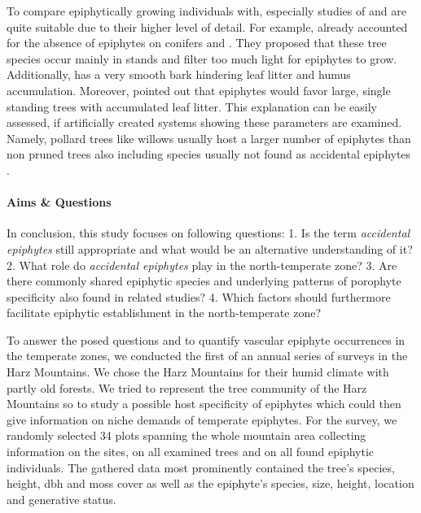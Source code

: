 \documentclass[12pt, a4paper, oneside, draft]{scrartcl}
\begin{document}
	To compare epiphytically growing individuals with, especially studies of \textcite{Staeger1908} and \textcite{Loew1892} are quite suitable due to their higher level of detail. For example, \textcite[p. 34]{Staeger1908} already accounted for the absence of epiphytes on conifers and \fsylvatica. They proposed that these tree species occur mainly in  stands and filter too much light for epiphytes to grow. Additionally, \fsylvatica has a very smooth bark hindering leaf litter and humus accumulation. Moreover, \textcite{Staeger1908} pointed out that epiphytes would favor large, single standing trees with accumulated leaf litter. This explanation can be easily assessed, if artificially created systems showing these parameters are examined. Namely, pollard trees like willows usually host a larger number of epiphytes than non pruned trees also including species usually not found as accidental epiphytes \parencite[compare with ][]{Willis1893, Geisenheyner1895, Carriere1977, Bolle1891, Loew1892, Steenis1928, Steenis1925, Jaap1895}.

	
	\paragraph{Aims \& Questions}
	In conclusion, this study focuses on following questions: 1. Is the term \emph{accidental epiphytes} still appropriate and what would be an alternative understanding of it? 2. What role do \emph{accidental epiphytes} play in the north-temperate zone? 3. Are there commonly shared epiphytic species and underlying patterns of porophyte specificity also found in related studies? 4. Which factors should furthermore facilitate epiphytic establishment in the north-temperate zone? 
	
	To answer the posed questions and to quantify vascular epiphyte occurrences in the temperate zones, we conducted the first of an annual series of surveys in the Harz Mountains. We chose the Harz Mountains for their humid climate with partly old forests. We tried to represent the tree community of the Harz Mountains so to study a possible host specificity of epiphytes which could then give information on niche demands of temperate epiphytes. For the survey, we randomly selected 34 plots spanning the whole mountain area collecting information on the sites, on all examined trees and on all found epiphytic individuals. The gathered data most prominently contained the tree's species, height, dbh and moss cover as well as the epiphyte's species, size, height, location and generative status. 
	
\end{document}
